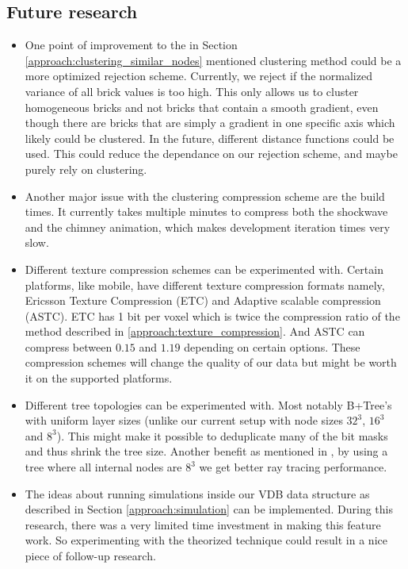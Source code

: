 \newpage
\subsection{Future research} \label{conclusion:future_research}

\begin{itemize}
    \item One point of improvement to the in Section \ref{approach:clustering_similar_nodes} mentioned clustering method could be a more optimized rejection scheme. Currently, we reject if the normalized variance of all brick values is too high. This only allows us to cluster homogeneous bricks and not bricks that contain a smooth gradient, even though there are bricks that are simply a gradient in one specific axis which likely could be clustered. In the future, different distance functions could be used. This could reduce the dependance on our rejection scheme, and maybe purely rely on clustering. 
    \item Another major issue with the clustering compression scheme are the build times. It currently takes multiple minutes to compress both the shockwave and the chimney animation, which makes development iteration times very slow.
    \item Different texture compression schemes can be experimented with. Certain platforms, like mobile, have different texture compression formats namely, Ericsson Texture Compression (ETC) and Adaptive scalable compression (ASTC). ETC has 1 bit per voxel which is twice the compression ratio of the method described in \ref{approach:texture_compression}. And ASTC can compress between $0.15$ and $1.19$ depending on certain options. These compression schemes will change the quality of our data but might be worth it on the supported platforms.
    \item Different tree topologies can be experimented with. Most notably B+Tree's with uniform layer sizes (unlike our current setup with node sizes $32^3$, $16^3$ and $8^3$). This might make it possible to deduplicate many of the bit masks and thus shrink the tree size. Another benefit as mentioned in \cite{hoetzlein2016gvdb}, by using a tree where all internal nodes are $8^3$ we get better ray tracing performance.
    \item The ideas about running simulations inside our VDB data structure as described in Section \ref{approach:simulation} can be implemented. During this research, there was a very limited time investment in making this feature work. So experimenting with the theorized technique could result in a nice piece of follow-up research.
\end{itemize}

